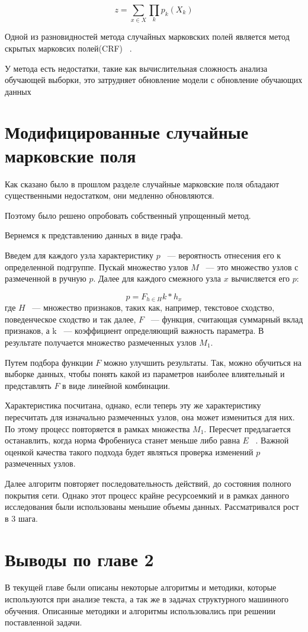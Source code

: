 \documentclass[annotation,times,page4]{itmo-student-thesis}
\begin{document}
\[
    z = \sum_{x \in X}\prod_{k} p_{k} (X_{k})
\]

Одной из разновидностей метода случайных марковских полей является метод скрытых марковсих полей(CRF) ~\cite{lafferty2001conditional, antongondon2013}.

У метода есть недостатки, такие как вычислительная сложность анализа обучающей выборки, это затрудняет обновление модели с обновление обучающих данных 
\section{Модифицированные случайные марковские поля}
Как сказано было в прошлом разделе случайные марковские поля обладают существенными недостатком, они медленно обновляются.

Поэтому было решено опробовать собственный упрощенный метод.

Вернемся к представлению данных в виде графа. 

Введем для каждого узла характеристику $p$ ~--- вероятность отнесения его к определенной подгруппе. Пускай множество узлов $M$ ~--- это множество узлов с размеченной в ручную $p$. Далее для каждого смежного узла $x$ вычисляется его $p$: 

\[
    p = F_{h \in H}k*h_{x}
\] 
где $H$ ~--- множество признаков, таких как, например, текстовое сходство, поведенческое сходство и так далее, $F$ ~--- функция, считающая суммарный вклад признаков, а k ~--- коэффициент определяющий важность параметра. В результате получается множество размеченных узлов $M_{1}$.

Путем подбора функции $F$ можно улучшить результаты. Так, можно обучиться на выборке данных, чтобы понять какой из параметров наиболее влиятельный и представлять $F$ в виде линейной комбинации.

Характеристика посчитана, однако, если теперь эту же характеристику пересчитать для изначально размеченных узлов, она может измениться для них. По этому процесс повторяется в рамках множества $M_{1}$. Пересчет предлагается останавлить, когда норма Фробениуса станет меньше либо равна $E$ ~\cite{lankaster1978}. Важной оценкой качества такого подхода будет являться проверка изменений $p$ размеченных узлов. 

Далее алгоритм повторяет последовательность действий, до состояния полного покрытия сети. Однако этот процесс крайне ресурсоемкий и в рамках данного исследования были использованы меньшие объемы данных. Рассматривался рост в 3 шага.
 
\section{Выводы по главе 2}
В текущей главе были описаны некоторые алгоритмы и методики, которые используются при анализе текста, а так же в задачах структурного машинного обучения. Описанные методики и алгоритмы использовались при решении поставленной задачи.
 
\end{document}
